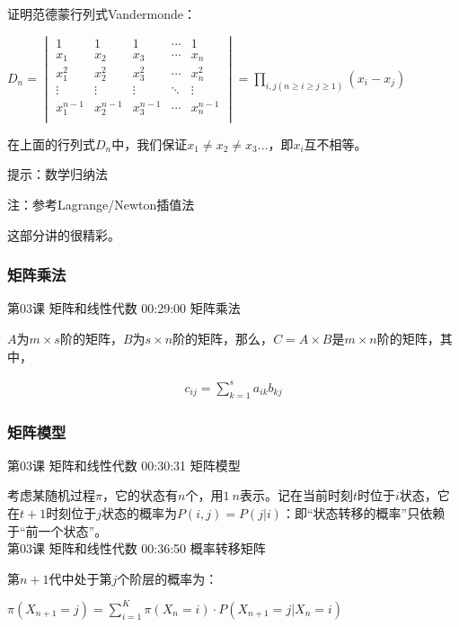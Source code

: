 \documentclass[UTF8]{ctexbook}
\begin{document}
证明范德蒙行列式Vandermonde：

$D_{n}=
\begin{vmatrix}
1 & 1 & 1 & \cdots & 1 \\
x_{1} & x_{2} & x_{3}  & \cdots & x_{n} \\
x_{1}^{2} & x_{2}^{2} & x_{3}^{2}  & \cdots & x_{n}^{2} \\
\vdots & \vdots & \vdots  & \ddots & \vdots \\
x_{1}^{n-1} & x_{2}^{n-1} & x_{3}^{n-1}  & \cdots & x_{n}^{n-1} \\
\end{vmatrix}
=\underset{i,j(n \geq i \geq j \geq 1)}{\prod }(x_{i}-x_{j})$ \quad

在上面的行列式$D_{n}$中，我们保证$x_{1} \neq x_{2} \neq x_{3} \dots$，即$x_{i}$互不相等。

提示：数学归纳法

注：参考Lagrange/Newton插值法

这部分讲的很精彩。




\subsubsection{矩阵乘法}

第03课 矩阵和线性代数 00:29:00 矩阵乘法

$A$为$m \times s$阶的矩阵，$B$为$s \times n$阶的矩阵，那么，$C=A \times B$是$m \times n$阶的矩阵，其中，

\begin{equation}
\begin{aligned}
c_{ij}=\sum_{k=1}^{s}a_{ik}b_{kj}
\end{aligned}
\end{equation}

\subsubsection{矩阵模型}

第03课 矩阵和线性代数 00:30:31 矩阵模型

考虑某随机过程$\pi$，它的状态有$n$个，用$1~n$表示。记在当前时刻$t$时位于$i$状态，它在$t+1$时刻位于$j$状态的概率为$P(i,j)=P(j|i)$：即“状态转移的概率”只依赖于“前一个状态”。\\

第03课 矩阵和线性代数 00:36:50 概率转移矩阵

第$n+1$代中处于第$j$个阶层的概率为：

$\pi(X_{n+1}=j)=\sum_{i=1}^{K}\pi(X_{n}=i) \cdot P(X_{n+1}=j|X_{n}=i)$
\end{document}
